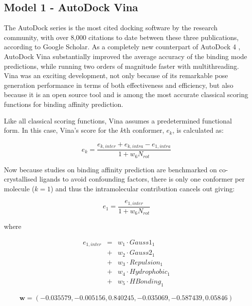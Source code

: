 \subsection{Model 1 - AutoDock Vina}

The AutoDock series \citep{597,596,595} is the most cited docking software by the research community, with over 8,000 citations to date between these three publications, according to Google Scholar. As a completely new counterpart of AutoDock 4 \citep{596}, AutoDock Vina \citep{595} substantially improved the average accuracy of the binding mode predictions, while running two orders of magnitude faster with multithreading. Vina was an exciting development, not only because of its remarkable pose generation performance in terms of both effectiveness and efficiency, but also because it is an open source tool and is among the most accurate classical scoring functions for binding affinity prediction.

Like all classical scoring functions, Vina assumes a predetermined functional form. In this case, Vina's score for the $k$th conformer, $e_k$, is calculated as:

\begin{equation}
\label{rfscore3:e_k}
e_k=\frac{e_{k,inter}+e_{k,intra}-e_{1,intra}}{1+w_6N_{rot}}
\end{equation}

Now because studies on binding affinity prediction are benchmarked on co-crystallised ligands to avoid confounding factors, there is only one conformer per molecule ($k=1$) and thus the intramolecular contribution cancels out giving:

\begin{equation}
\label{rfscore3:e_1}
e_1=\frac{e_{1,inter}}{1+w_6N_{rot}}
\end{equation}

where

\begin{eqnarray}
\label{rfscore3:e_1_inter}
e_{1,inter} &=& w_1 \cdot Gauss1_1 \nonumber \\
            &+& w_2 \cdot Gauss2_1 \nonumber \\
		    &+& w_3 \cdot Repulsion_1 \nonumber \\
		    &+& w_4 \cdot Hydrophobic_1 \nonumber \\
		    &+& w_5 \cdot HBonding_1
\end{eqnarray}

\begin{equation}
\label{rfscore3:w}
\mathbf w=(-0.035579,-0.005156,0.840245,-0.035069,-0.587439,0.05846)
\end{equation}

